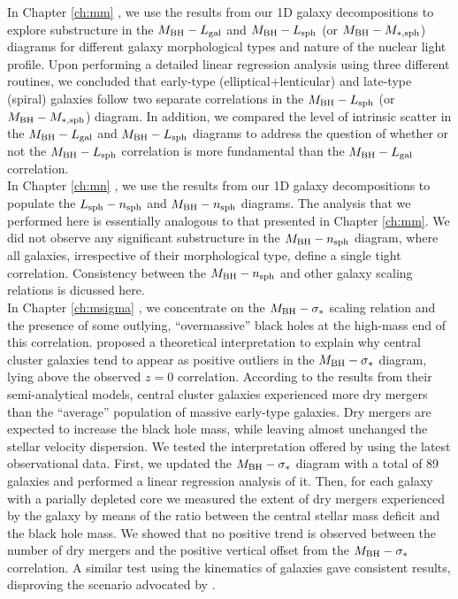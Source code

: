 In Chapter \ref{ch:mm} \citep{paperII}, 
we use the results from our 1D galaxy decompositions 
to explore substructure in the $M_{\rm BH} - L_{\rm gal}$ and $M_{\rm BH} - L_{\rm sph}$ 
(or $M_{\rm BH} - M_{\rm *,sph}$) diagrams 
for different galaxy morphological types and nature of the nuclear light profile. 
Upon performing a detailed linear regression analysis using three different routines, 
we concluded that early-type (elliptical+lenticular) and late-type (spiral) galaxies 
follow two separate correlations in the $M_{\rm BH} - L_{\rm sph}$ (or $M_{\rm BH} - M_{\rm *,sph}$) diagram. 
In addition, we compared the level of intrinsic scatter 
in the $M_{\rm BH} - L_{\rm gal}$ and $M_{\rm BH} - L_{\rm sph}$ diagrams 
to address the question of whether or not the $M_{\rm BH} - L_{\rm sph}$ correlation 
is more fundamental than the $M_{\rm BH} - L_{\rm gal}$ correlation. \\

In Chapter \ref{ch:mn} \citep{paperIII}, 
we use the results from our 1D galaxy decompositions to populate 
the $L_{\rm sph} - n_{\rm sph}$ and $M_{\rm BH} - n_{\rm sph}$ diagrams. 
The analysis that we performed here is essentially analogous to that presented in Chapter \ref{ch:mm}.  
We did not observe any significant substructure in the $M_{\rm BH} - n_{\rm sph}$ diagram, 
where all galaxies, irrespective of their morphological type, define a single tight correlation. 
Consistency between the $M_{\rm BH} - n_{\rm sph}$ and other galaxy scaling relations 
is dicussed here.  \\

In Chapter \ref{ch:msigma} \citep{savorgnangraham2015}, 
we concentrate on the $M_{\rm BH} - \sigma_*$ scaling relation 
and the presence of some outlying, ``overmassive'' black holes at the high-mass end of this correlation. 
\cite{volontericiotti2013} proposed a theoretical interpretation 
to explain why central cluster galaxies tend to appear as positive outliers 
in the $M_{\rm BH} - \sigma_*$ diagram, lying above the observed $z=0$ correlation. 
According to the results from their semi-analytical models, 
central cluster galaxies experienced more dry mergers 
than the ``average'' population of massive early-type galaxies. 
Dry mergers are expected to increase the black hole mass, 
while leaving almost unchanged the stellar velocity dispersion. 
We tested the interpretation offered by \cite{volontericiotti2013} 
using the latest observational data. 
First, we updated the $M_{\rm BH} - \sigma_*$ diagram with a total of 89 galaxies 
and performed a linear regression analysis of it. 
Then, for each galaxy with a parially depleted core 
we measured the extent of dry mergers experienced by the galaxy 
by means of the ratio between the central stellar mass deficit and the black hole mass. 
We showed that no positive trend is observed between the number of dry mergers 
and the positive vertical offset from the $M_{\rm BH} - \sigma_*$ correlation. 
A similar test using the kinematics of galaxies gave consistent results, 
disproving the scenario advocated by \cite{volontericiotti2013}. \\


